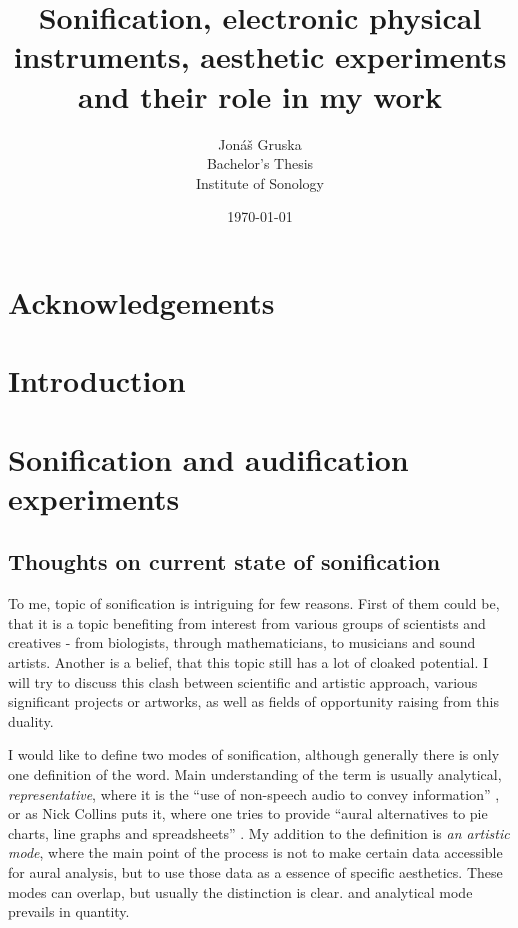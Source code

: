 \documentclass[11pt,a4paper,oneside]{report}
\begin{document}
\title{Sonification, electronic physical instruments, aesthetic experiments and their role in my work}
\author{Jonáš Gruska\\
				Bachelor's Thesis\\
				Institute of Sonology}
\date{\today}

\maketitle

\begin{abstract}
\end{abstract}

\chapter*{Acknowledgements}

\tableofcontents

\chapter{Introduction}

\chapter{Sonification and audification experiments}

\section{Thoughts on current state of sonification}
To me, topic of sonification is intriguing for few reasons. First of them could be, that it is a topic benefiting from interest from various groups of scientists and creatives - from biologists, through mathematicians, to musicians and sound artists. Another is a belief, that this topic still has a lot of cloaked potential. I will try to discuss this clash between scientific and artistic approach, various significant projects or artworks, as well as fields of opportunity raising from this duality.

I would like to define two modes of sonification, although generally there is only one definition of the word. Main understanding of the term is usually analytical, \textit{representative}, where it is the ``use of non-speech audio to convey information'' \cite{Fitch}, or as Nick Collins puts it, where one tries to provide ``aural alternatives to pie charts, line graphs and spreadsheets'' \cite{Collins2006}. My addition to the definition is \textit{an artistic mode}, where the main point of the process is not to make certain data accessible for aural analysis, but to use those data as a essence of specific aesthetics. These modes can overlap, but usually the distinction is clear. and analytical mode prevails in quantity.
\end{document}
